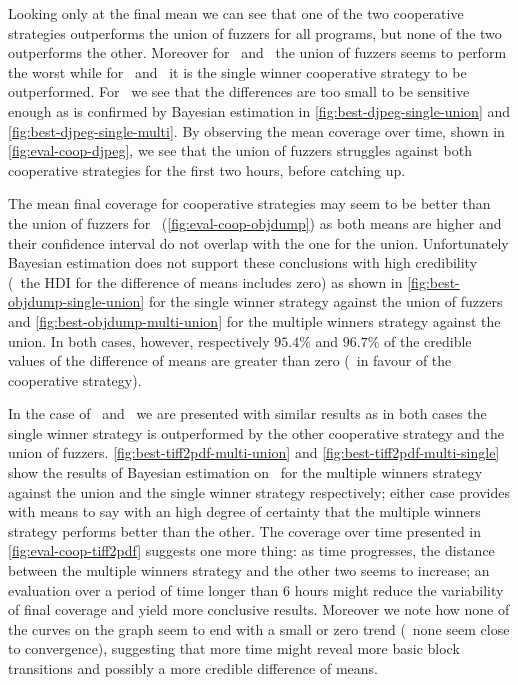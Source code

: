 Looking only at the final mean we can see that one of the two cooperative
strategies outperforms the union of fuzzers for all programs, but none of the
two outperforms the other. Moreover for \djpeg\ and \objdump\ the union of
fuzzers seems to perform the worst while for \tiffpdf\ and \listswf\ it is the
single winner cooperative strategy to be outperformed. For \djpeg\ we see that
the differences are too small to be sensitive enough as is confirmed by Bayesian
estimation in \autoref{fig:best-djpeg-single-union} and
\autoref{fig:best-djpeg-single-multi}. By observing the mean coverage over time,
shown in \autoref{fig:eval-coop-djpeg}, we see that the union of fuzzers
struggles against both cooperative strategies for the first two hours, before
catching up.

The mean final coverage for cooperative strategies may seem to be better than
the union of fuzzers for \objdump\ (\autoref{fig:eval-coop-objdump}) as both
means are higher and their confidence interval do not overlap with the one for
the union. Unfortunately Bayesian estimation does not support these conclusions
with high credibility (\ie~the \ac{HDI} for the difference of means includes
zero) as shown in \autoref{fig:best-objdump-single-union} for the single winner
strategy against the union of fuzzers and \autoref{fig:best-objdump-multi-union}
for the multiple winners strategy against the union. In both cases, however,
respectively $95.4\%$ and $96.7\%$ of the credible values of the difference of
means are greater than zero (\ie~in favour of the cooperative strategy).

In the case of \tiffpdf\ and \listswf\ we are presented with similar results as
in both cases the single winner strategy is outperformed by the other
cooperative strategy and the union of fuzzers.
\autoref{fig:best-tiff2pdf-multi-union} and
\autoref{fig:best-tiff2pdf-multi-single} show the results of Bayesian estimation
on \tiffpdf\ for the multiple winners strategy against the union and the single
winner strategy respectively; either case provides with means to say with an
high degree of certainty that the multiple winners strategy performs better than
the other. The coverage over time presented in \autoref{fig:eval-coop-tiff2pdf}
suggests one more thing: as time progresses, the distance between the multiple
winners strategy and the other two seems to increase; an evaluation over a
period of time longer than $6$ hours might reduce the variability of final
coverage and yield more conclusive results. Moreover we note how none of the
curves on the graph seem to end with a small or zero trend (\ie~none seem close
to convergence), suggesting that more time might reveal more basic block
transitions and possibly a more credible difference of means.

